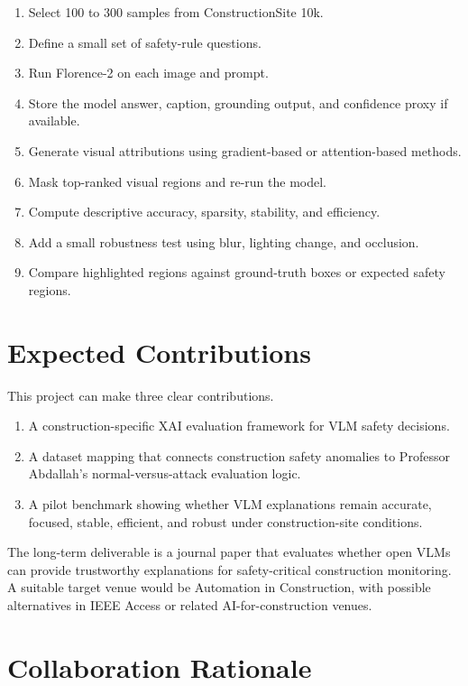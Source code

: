 \documentclass[11pt,letterpaper]{article}
\begin{document}
\begin{enumerate}
  \item Select 100 to 300 samples from ConstructionSite 10k.
  \item Define a small set of safety-rule questions.
  \item Run Florence-2 on each image and prompt.
  \item Store the model answer, caption, grounding output, and confidence proxy if available.
  \item Generate visual attributions using gradient-based or attention-based methods.
  \item Mask top-ranked visual regions and re-run the model.
  \item Compute descriptive accuracy, sparsity, stability, and efficiency.
  \item Add a small robustness test using blur, lighting change, and occlusion.
  \item Compare highlighted regions against ground-truth boxes or expected safety regions.
\end{enumerate}

\section{Expected Contributions}

This project can make three clear contributions.

\begin{enumerate}
  \item A construction-specific XAI evaluation framework for VLM safety decisions.
  \item A dataset mapping that connects construction safety anomalies to Professor Abdallah's normal-versus-attack evaluation logic.
  \item A pilot benchmark showing whether VLM explanations remain accurate, focused, stable, efficient, and robust under construction-site conditions.
\end{enumerate}

The long-term deliverable is a journal paper that evaluates whether open VLMs can provide trustworthy explanations for safety-critical construction monitoring. A suitable target venue would be Automation in Construction, with possible alternatives in IEEE Access or related AI-for-construction venues.

\section{Collaboration Rationale}
\end{document}
